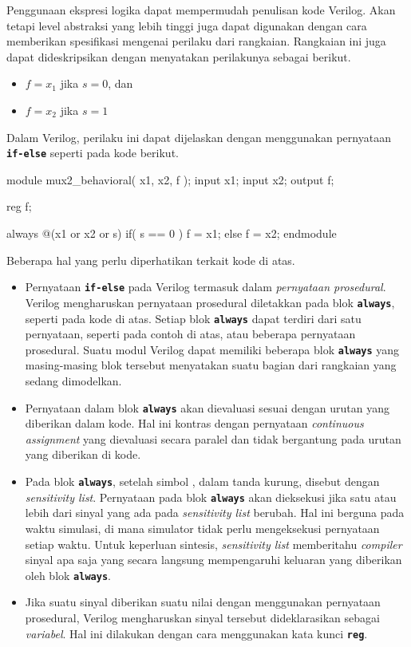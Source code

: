 Penggunaan ekspresi logika dapat mempermudah penulisan kode Verilog.
Akan tetapi level abstraksi yang lebih tinggi juga dapat digunakan
dengan cara memberikan spesifikasi mengenai perilaku dari rangkaian.
Rangkaian ini juga dapat dideskripsikan dengan menyatakan perilakunya
sebagai berikut.
\begin{itemize}
\item $f = x_1$ jika $s = 0$, dan
\item $f = x_2$ jika $s = 1$
\end{itemize}

Dalam Verilog, perilaku ini dapat dijelaskan dengan menggunakan
pernyataan {\tt \bf if-else} seperti pada kode berikut.
{
\begin{verilogcode}
module mux2_behavioral( x1, x2, f );
  input x1;
  input x2;
  output f;

  reg f;

  always @(x1 or x2 or s)
    if( s == 0 )
      f = x1;
    else
      f = x2;
endmodule
\end{verilogcode}
}

Beberapa hal yang perlu diperhatikan terkait kode di atas.

\begin{itemize}
\item Pernyataan {\tt\textbf{if-else}} pada Verilog termasuk dalam
\textit{pernyataan prosedural}.
Verilog mengharuskan pernyataan prosedural diletakkan pada blok
{\tt\textbf{always}},
seperti pada kode di atas. Setiap blok {\tt\textbf{always}} dapat terdiri dari satu
pernyataan, seperti pada contoh di atas, atau beberapa pernyataan prosedural.
Suatu modul Verilog dapat memiliki beberapa
blok {\tt\textbf{always}} yang masing-masing blok tersebut menyatakan suatu bagian
dari rangkaian yang sedang dimodelkan.
\item Pernyataan dalam blok {\tt\textbf{always}} akan dievaluasi sesuai dengan urutan yang
diberikan dalam kode. Hal ini kontras dengan pernyataan
\textit{continuous assignment}
yang dievaluasi secara paralel dan tidak bergantung pada urutan yang diberikan
di kode.
\item Pada blok {\tt\textbf{always}}, setelah simbol \textbf{\@},
dalam tanda kurung, disebut
dengan \textit{sensitivity list}. Pernyataan pada blok {\tt\textbf{always}} akan dieksekusi
jika satu atau lebih dari sinyal yang ada pada {\it sensitivity list} berubah.
Hal ini berguna pada waktu simulasi, di mana simulator tidak perlu mengeksekusi
pernyataan setiap waktu.
Untuk keperluan sintesis, \textit{sensitivity list} memberitahu
\textit{compiler} sinyal
apa saja yang secara langsung mempengaruhi keluaran yang diberikan oleh blok
{\tt\textbf{always}}.
\item Jika suatu sinyal diberikan suatu nilai dengan menggunakan pernyataan
prosedural, Verilog mengharuskan sinyal tersebut dideklarasikan sebagai
\textit{variabel}. Hal ini dilakukan dengan cara menggunakan kata kunci
{\tt\textbf{reg}}.
\end{itemize}
